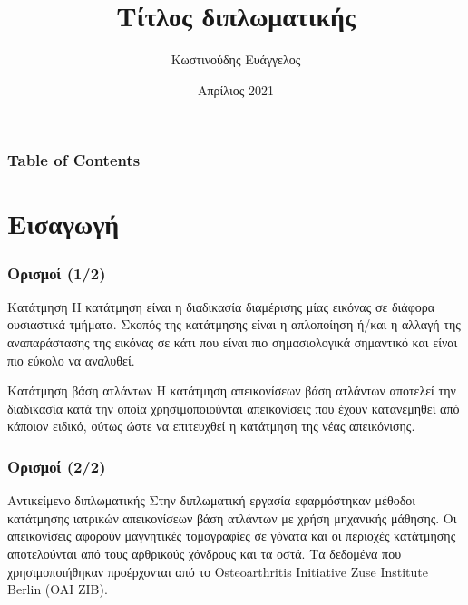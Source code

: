\documentclass{beamer}
\title[Short title] {Τίτλος διπλωματικής}
\institute 
{
    Αριστοτέλειο Πανεπιστήμιο Θεσσαλονίκης \\
    Τμήμα Ηλεκτρολόγων Μηχανικών και Μηχανικών Υπολογιστών \\
    Τομέας Ηλεκτρονικής και Υπολογιστών
}
\author {Κωστινούδης Ευάγγελος}
\date{Απρίλιος 2021}
\begin{document}
\begin{frame}

\maketitle


\end{frame}

\begin{frame}
\frametitle{Table of Contents}
\tableofcontents
\end{frame}

\section{Εισαγωγή}

\begin{frame}
\frametitle{Ορισμοί (1/2)}
\begin{block}{Κατάτμηση}
Η κατάτμηση είναι η διαδικασία διαμέρισης μίας εικόνας σε διάφορα ουσιαστικά
τμήματα. Σκοπός της κατάτμησης είναι η απλοποίηση ή/και η αλλαγή της
αναπαράστασης της εικόνας σε κάτι που είναι πιο σημασιολογικά σημαντικό και
είναι πιο εύκολο να αναλυθεί.
\end{block} \pause

\begin{block}{Κατάτμηση βάση ατλάντων}
Η κατάτμηση απεικονίσεων βάση ατλάντων αποτελεί την διαδικασία κατά την οποία
χρησιμοποιούνται απεικονίσεις που έχουν κατανεμηθεί από κάποιον ειδικό, ούτως
ώστε να επιτευχθεί η κατάτμηση της νέας απεικόνισης.
\end{block} 
\end{frame}

\begin{frame}
\frametitle{Ορισμοί (2/2)}
\begin{block}{Αντικείμενο διπλωματικής}
Στην διπλωματική εργασία εφαρμόστηκαν μέθοδοι κατάτμησης ιατρικών απεικονίσεων
βάση ατλάντων με χρήση μηχανικής μάθησης. Οι απεικονίσεις αφορούν μαγνητικές
τομογραφίες σε γόνατα και οι περιοχές κατάτμησης αποτελούνται από τους
αρθρικούς χόνδρους και τα οστά. Τα δεδομένα που χρησιμοποιήθηκαν προέρχονται
από το Osteoarthritis Initiative Zuse Institute Berlin (OAI ZIB).
\end{block}
\end{frame}
\end{document}
